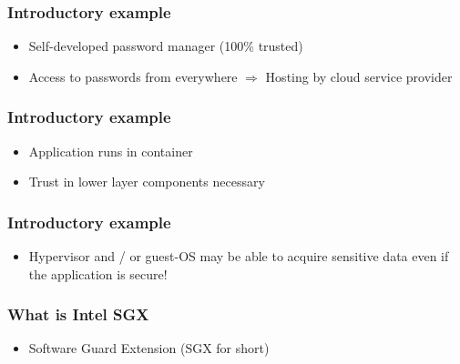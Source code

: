 \begin{frame}
    \frametitle{Introductory example}
    \begin{itemize}
        \item Self-developed password manager (100\% trusted)
        \item Access to passwords from everywhere \newline$ \Rightarrow$ Hosting by cloud service provider
    \end{itemize}
    \centering
\end{frame}

\begin{frame}
    \frametitle{Introductory example}
    \begin{itemize}
        \item Application runs in container
        \item Trust in lower layer components necessary
    \end{itemize}
    \centering
\end{frame}

\begin{frame}
    \frametitle{Introductory example}
    \begin{itemize}
        \item Hypervisor and / or guest-OS may be able to acquire sensitive data even if the application is secure!
    \end{itemize}
    \centering
\end{frame}

\begin{frame}
    \frametitle{What is Intel SGX}
    \begin{itemize}
        \item Software Guard Extension (SGX for short)
    \end{itemize}
\end{frame}